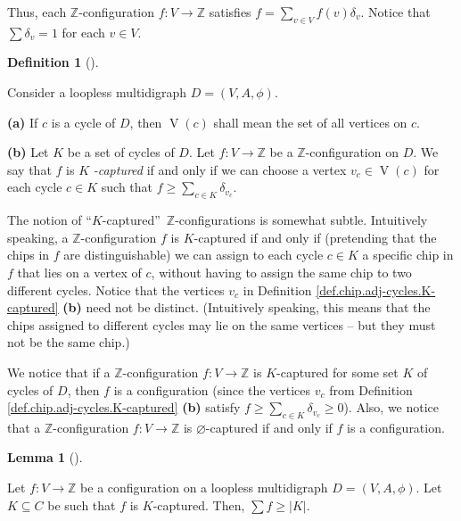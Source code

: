 \documentclass[numbers=enddot,12pt,final,onecolumn,notitlepage]{scrartcl}%
\theoremstyle{definition}
\newtheorem{lem}[theo]{Lemma}
\newenvironment{lemma}[1][]
{\begin{lem}[#1]\begin{leftbar}}
{\end{leftbar}\end{lem}}
\newtheorem{defi}[theo]{Definition}
\newenvironment{definition}[1][]
{\begin{defi}[#1]\begin{leftbar}}
{\end{leftbar}\end{defi}}
\let\sumnonlimits\sum
\renewcommand{\sum}{\sumnonlimits\limits}
\begin{document}
Thus, each $\mathbb{Z}$-configuration $f:V\rightarrow\mathbb{Z}$ satisfies
$f=\sum_{v\in V}f\left(  v\right)  \delta_{v}$. Notice that $\sum\delta_{v}=1$
for each $v\in V$.

\begin{definition}
\label{def.chip.adj-cycles.K-captured}Consider a loopless multidigraph
$D=\left(  V,A,\phi\right)  $.

\textbf{(a)} If $c$ is a cycle of $D$, then $\operatorname*{V}\left(
c\right)  $ shall mean the set of all vertices on $c$.

\textbf{(b)} Let $K$ be a set of cycles of $D$. Let $f:V\rightarrow\mathbb{Z}$
be a $\mathbb{Z}$-configuration on $D$. We say that $f$ is $K$%
\textit{-captured} if and only if we can choose a vertex $v_{c}\in
\operatorname*{V}\left(  c\right)  $ for each cycle $c\in K$ such that
$f\geq\sum_{c\in K}\delta_{v_{c}}$.
\end{definition}

The notion of \textquotedblleft$K$-captured\textquotedblright\ $\mathbb{Z}%
$-configurations is somewhat subtle. Intuitively speaking, a $\mathbb{Z}%
$-configuration $f$ is $K$-captured if and only if (pretending that the chips
in $f$ are distinguishable) we can assign to each cycle $c\in K$ a specific
chip in $f$ that lies on a vertex of $c$, without having to assign the same
chip to two different cycles. Notice that the vertices $v_{c}$ in Definition
\ref{def.chip.adj-cycles.K-captured} \textbf{(b)} need not be distinct.
(Intuitively speaking, this means that the chips assigned to different cycles
may lie on the same vertices -- but they must not be the same chip.)

We notice that if a $\mathbb{Z}$-configuration $f:V\rightarrow\mathbb{Z}$ is
$K$-captured for some set $K$ of cycles of $D$, then $f$ is a configuration
(since the vertices $v_{c}$ from Definition
\ref{def.chip.adj-cycles.K-captured} \textbf{(b)} satisfy $f\geq\sum_{c\in
K}\delta_{v_{c}}\geq0$). Also, we notice that a $\mathbb{Z}$-configuration
$f:V\rightarrow\mathbb{Z}$ is $\varnothing$-captured if and only if $f$ is a configuration.

\begin{lemma}
\label{lem.chip.adj-cycles.capture-size}Let $f:V\rightarrow\mathbb{Z}$ be a
configuration on a loopless multidigraph $D=\left(  V,A,\phi\right)  $. Let
$K\subseteq C$ be such that $f$ is $K$-captured. Then, $\sum f\geq\left\vert
K\right\vert $.
\end{lemma}
\end{document}
